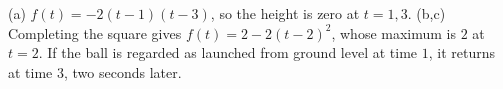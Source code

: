 (a) $f(t)=-2(t-1)(t-3)$, so the height is zero at $\boxed{t=1,3}$. (b,c) Completing the square gives $f(t)=2-2(t-2)^2$, whose maximum is $\boxed2$ at $\boxed{t=2}$. If the ball is regarded as launched from ground level at time $1$, it returns at time $3$, two seconds later.
